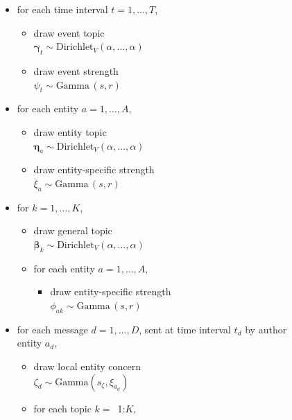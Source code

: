 \begin{figure}[!ht]
\begin{mdframed}[userdefinedwidth=3.0in,align=center]
\small
\begin{itemize}[leftmargin=*]
\item for each time interval $t = 1, \ldots, T$,
	\begin{itemize}[leftmargin=*]
	\item draw event topic\\ $\mathbold{\gamma}_t \sim
          \textrm{Dirichlet}_V(\alpha, \ldots, \alpha)$
	\item draw event strength \\$\psi_{t} \sim \textrm{Gamma}\,(s, r)$
	\end{itemize}
\item for each entity $a = 1, \ldots, A$,
	\begin{itemize}[leftmargin=*]
	\item draw entity topic \\$\mathbold{\eta}_a \sim
          \textrm{Dirichlet}_V (\alpha, \ldots, \alpha)$
	\item draw entity-specific strength \\$\xi_{a} \sim \textrm{Gamma}\,(s, r)$
	\end{itemize}
\item for $k= 1, \ldots, K$,
	\begin{itemize}[leftmargin=*]
	\item draw general topic\\ $\mathbold{\beta}_k \sim
          \textrm{Dirichlet}_V (\alpha, \ldots, \alpha)$
	\item for each entity $a=1, \ldots, A$,
		\begin{itemize}[leftmargin=*]
		\item draw entity-specific strength \\$\phi_{ak} \sim \textrm{Gamma}\,(s, r)$
		\end{itemize}
	\end{itemize}
\item for each message $d= 1, \ldots, D$, sent at time interval $t_d$
  by author entity $a_d$,
	\begin{itemize}[leftmargin=*]
	\item draw local entity concern \\$\zeta_{d} \sim \mbox{Gamma}(s_\zeta, \xi_{a_d})$
	\item for each topic $k=$~1:$K$,
		\begin{itemize}[leftmargin=*]

\end{itemize}
\end{itemize}
\end{itemize}
\end{mdframed}
\end{figure}
